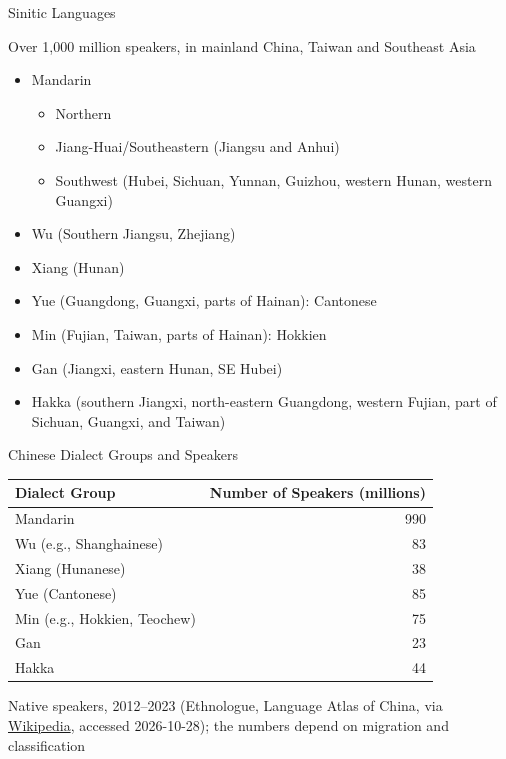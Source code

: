 \documentclass{beamer}
\begin{document}
\begin{frame}{Sinitic Languages}

Over 1,000 million speakers, in mainland China, Taiwan and Southeast Asia
\begin{itemize}
\item Mandarin
  \begin{itemize}
  \item Northern
  \item Jiang-Huai/Southeastern (Jiangsu and Anhui)
  \item Southwest (Hubei, Sichuan, Yunnan, Guizhou, western Hunan, western Guangxi)
  \end{itemize}
\item Wu (Southern Jiangsu, Zhejiang)
\item Xiang (Hunan)
\item Yue (Guangdong, Guangxi, parts of Hainan): Cantonese
\item Min (Fujian, Taiwan, parts of Hainan): Hokkien
\item Gan (Jiangxi, eastern Hunan, SE Hubei)
\item Hakka (southern Jiangxi, north-eastern Guangdong, western Fujian, part
of Sichuan, Guangxi, and Taiwan)
\end{itemize}

\end{frame}

\begin{frame}{Chinese Dialect Groups and Speakers}
  \begin{center}
\begin{tabular}{lr}
\hline
\textbf{Dialect Group} & \textbf{Number of Speakers (millions)} \\ \hline
Mandarin & 990 \\ \hline
Wu (e.g., Shanghainese) & 83 \\ \hline
Xiang (Hunanese) & 38 \\ \hline
Yue (Cantonese) & 85 \\ \hline
Min (e.g., Hokkien, Teochew) & 75 \\ \hline
Gan & 23 \\ \hline
Hakka & 44 \\ \hline
\end{tabular}

\end{center}

Native speakers, 2012--2023 (Ethnologue, Language Atlas of China, via
\href{https://en.wikipedia.org/wiki/Varieties_of_Chinese}{Wikipedia}, accessed 2026-10-28); the numbers depend on migration and classification
\end{frame}
\end{document}
